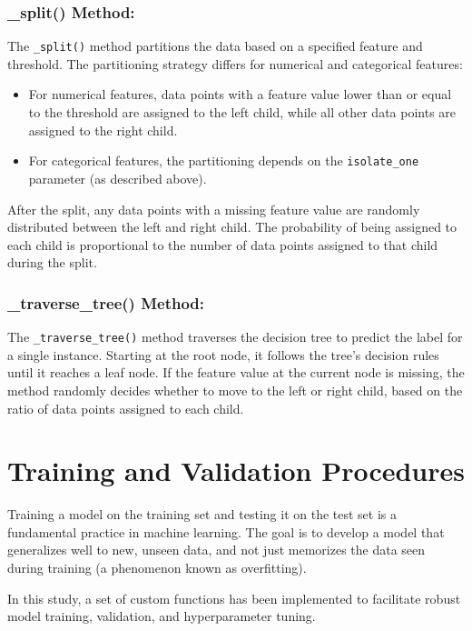 \documentclass{article}
\begin{document}
\subsubsection*{\_split() Method:}

The \texttt{\_split()} method partitions the data based on a specified feature and threshold. The partitioning strategy differs for numerical and categorical features:

\begin{itemize}
\item For numerical features, data points with a feature value lower than or equal to the threshold are assigned to the left child, while all other data points are assigned to the right child.
\item For categorical features, the partitioning depends on the \texttt{isolate\_one} parameter (as described above).
\end{itemize}

After the split, any data points with a missing feature value are randomly distributed between the left and right child. The probability of being assigned to each child is proportional to the number of data points assigned to that child during the split.

\subsubsection*{\_traverse\_tree() Method:}

The \texttt{\_traverse\_tree()} method traverses the decision tree to predict the label for a single instance. Starting at the root node, it follows the tree's decision rules until it reaches a leaf node. If the feature value at the current node is missing, the method randomly decides whether to move to the left or right child, based on the ratio of data points assigned to each child.

\section{Training and Validation Procedures}

Training a model on the training set and testing it on the test set is a fundamental practice in machine learning. The goal is to develop a model that generalizes well to new, unseen data, and not just memorizes the data seen during training (a phenomenon known as overfitting).

In this study, a set of custom functions has been implemented to facilitate robust model training, validation, and hyperparameter tuning.
\end{document}
